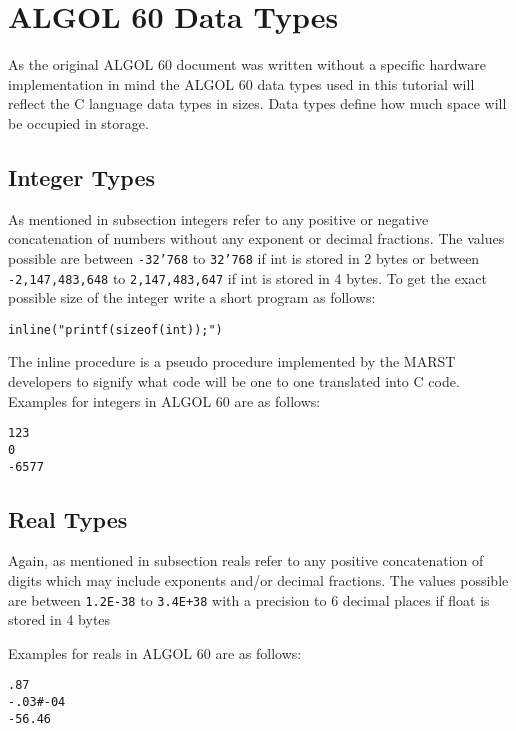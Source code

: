 \documentclass{article}
\begin{document}
\newpage

\section{ALGOL 60 Data Types} \label{datatypes}
As the original ALGOL 60 document was written without a specific hardware implementation in mind the ALGOL 60 data types used in this tutorial will reflect the C language data types in sizes. Data types define how much space will be occupied in storage.

\subsection{Integer Types}
As mentioned in subsection  integers refer to any positive or negative concatenation of numbers without any exponent or decimal fractions. The values possible are between \texttt{-32'768} to \texttt{32'768} if int is stored in 2 bytes or between \texttt{-2,147,483,648} to \texttt{2,147,483,647} if int is stored in 4 bytes. To get the exact possible size of the integer write a short program as follows:

\begin{lstlisting}[language={[60]algol}]
inline("printf(sizeof(int));")
\end{lstlisting}

The inline procedure is a pseudo procedure implemented by the MARST developers to signify what code will be one to one translated into C code. \\

Examples for integers in ALGOL 60 are as follows:

\begin{lstlisting}[language={[60]algol}]
123
0
-6577
\end{lstlisting}

\subsection{Real Types}
Again, as mentioned in subsection  reals refer to any positive concatenation of digits which may include exponents and/or decimal fractions. The values possible are between \texttt{1.2E-38} to \texttt{3.4E+38} with a precision to 6 decimal places if float is stored in 4 bytes

Examples for reals in ALGOL 60 are as follows:

\begin{lstlisting}[language={[60]algol}]
.87
-.03#-04
-56.46
\end{lstlisting}
\end{document}
